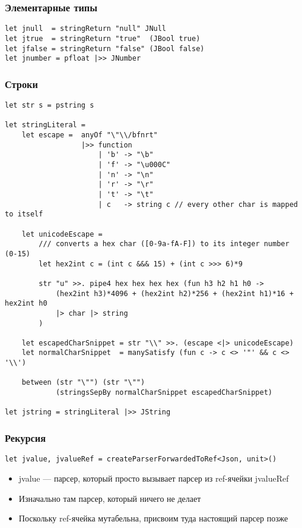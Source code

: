 \documentclass[xetex,mathserif,serif]{beamer}
\begin{document}
    \begin{frame}[fragile]
        \frametitle{Элементарные типы}
        \begin{verbatim}
let jnull  = stringReturn "null" JNull
let jtrue  = stringReturn "true"  (JBool true)
let jfalse = stringReturn "false" (JBool false)
let jnumber = pfloat |>> JNumber
        \end{verbatim}
    \end{frame}

    \begin{frame}[fragile]
        \frametitle{Строки}
        \begin{tiny}
            \begin{verbatim}
let str s = pstring s

let stringLiteral =
    let escape =  anyOf "\"\\/bfnrt"
                  |>> function
                      | 'b' -> "\b"
                      | 'f' -> "\u000C"
                      | 'n' -> "\n"
                      | 'r' -> "\r"
                      | 't' -> "\t"
                      | c   -> string c // every other char is mapped to itself

    let unicodeEscape =
        /// converts a hex char ([0-9a-fA-F]) to its integer number (0-15)
        let hex2int c = (int c &&& 15) + (int c >>> 6)*9

        str "u" >>. pipe4 hex hex hex hex (fun h3 h2 h1 h0 ->
            (hex2int h3)*4096 + (hex2int h2)*256 + (hex2int h1)*16 + hex2int h0
            |> char |> string
        )

    let escapedCharSnippet = str "\\" >>. (escape <|> unicodeEscape)
    let normalCharSnippet  = manySatisfy (fun c -> c <> '"' && c <> '\\')

    between (str "\"") (str "\"")
            (stringsSepBy normalCharSnippet escapedCharSnippet)

let jstring = stringLiteral |>> JString
            \end{verbatim}
        \end{tiny}
    \end{frame}

    \begin{frame}[fragile]
        \frametitle{Рекурсия}
        \begin{verbatim}
let jvalue, jvalueRef = createParserForwardedToRef<Json, unit>()
        \end{verbatim}
        \begin{itemize}
            \item jvalue --- парсер, который просто вызывает парсер из ref-ячейки jvalueRef
            \item Изначально там парсер, который ничего не делает
            \item Поскольку ref-ячейка мутабельна, присвоим туда настоящий парсер позже
        \end{itemize}
    \end{frame}
\end{document}
